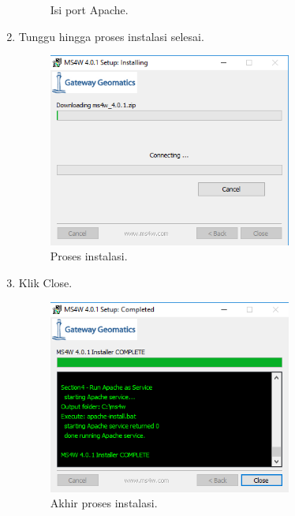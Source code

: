 \begin{enumerate}
\begin{figure}[H]
		\centering
		\caption{Isi port Apache.}
	\end{figure}
	\item  Tunggu hingga proses instalasi selesai.
	\hfill\break
	\begin{figure}[H]
		\includegraphics[width=8cm]{figures/Tugas4/1174089/7.png}
		\centering
		\caption{Proses instalasi.}
	\end{figure}
	\item  Klik Close.
	\hfill\break
	\begin{figure}[H]
		\includegraphics[width=8cm]{figures/Tugas4/1174089/8.png}
		\centering
		\caption{Akhir proses instalasi.}
	\end{figure}
\end{enumerate}
